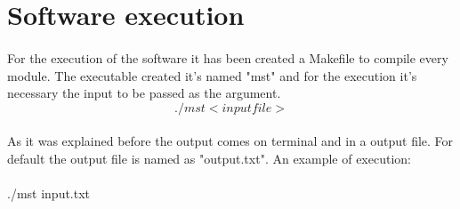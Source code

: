 \documentclass[titlepage]{article}
\begin{document}
    \section{Software execution}
    \paragraph{}
    For the execution of the software it has been created a Makefile to compile every module. The executable created it's named "mst" and for the execution it's necessary the input to be passed as the argument.
    $$
    ./mst <inputfile>
    $$ 
    \paragraph{}
    As it was explained before the output comes on terminal and in a output file. For default the output file is named as "output.txt". An example of execution:
    \paragraph{}
    ./mst input.txt
    
\end{document}
